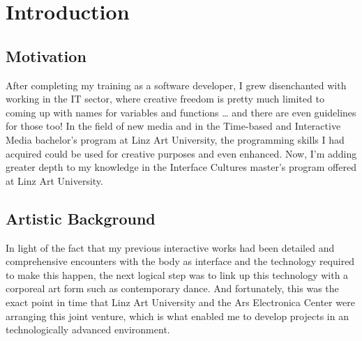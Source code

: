 
\chapter{Introduction} %

\label{Chapter1} %


\newcommand{\keyword}[1]{\textbf{#1}}
\newcommand{\tabhead}[1]{\textbf{#1}}
\newcommand{\code}[1]{\texttt{#1}}
\newcommand{\file}[1]{\texttt{\bfseries#1}}
\newcommand{\option}[1]{\texttt{\itshape#1}}


\section{Motivation}
After completing my training as a software developer, I grew disenchanted with working in the IT sector, where creative freedom is pretty much limited to coming up with names for variables and functions … and there are even guidelines for those too! In the field of new media and in the Time-based and Interactive Media bachelor's program at Linz Art University, the programming skills I had acquired could be used for creative purposes and even enhanced. Now, I'm adding greater depth to my knowledge in the Interface Cultures master's program offered at Linz Art University.


\section{Artistic Background}
In light of the fact that my previous interactive works had been detailed and comprehensive encounters with the body as interface and the technology required to make this happen, the next logical step was to link up this technology with a corporeal art form such as contemporary dance. And fortunately, this was the exact point in time that Linz Art University and the Ars Electronica Center were arranging this joint venture, which is what enabled me to develop projects in an technologically advanced environment.

